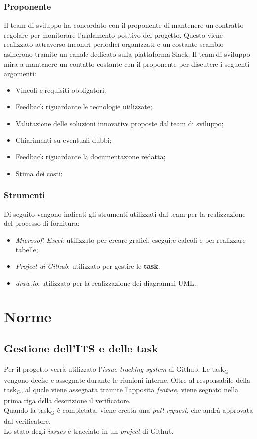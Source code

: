 \documentclass{article}
\begin{document}
\subsubsection{Proponente}
Il team di sviluppo ha concordato con il proponente di mantenere un contratto regolare per monitorare l'andamento positivo del progetto. Questo viene realizzato attraverso incontri periodici organizzati e un costante scambio asincrono tramite un canale dedicato sulla piattaforma Slack. Il team di sviluppo mira a mantenere un contatto costante con il proponente per discutere i seguenti argomenti:
\begin{itemize}
    \item Vincoli e requisiti obbligatori.
    \item Feedback riguardante le tecnologie utilizzate;
    \item Valutazione delle soluzioni innovative proposte dal team di sviluppo;
    \item Chiarimenti su eventuali dubbi;
    \item Feedback riguardante la documentazione redatta;
    \item Stima dei costi;
\end{itemize}

\subsubsection*{Strumenti}
Di seguito vengono indicati gli strumenti utilizzati dal team per la realizzazione del processo di fornitura:\begin{itemize}
    \item \textit{Microsoft Excel}: utilizzato per creare grafici, eseguire calcoli e per realizzare tabelle;
    \item \textit{Project di Github}: utilizzato per gestire le \textbf{task}.
    \item \textit{draw.io}: utilizzato per la realizzazione dei diagrammi UML.
\end{itemize}



\section{Norme}
\subsection{Gestione dell'ITS e delle task}
Per il progetto verrà utilizzato l'\textit{issue tracking system} di Github. Le task\textsubscript{G} vengono decise e assegnate durante le riunioni interne. Oltre al responsabile della task\textsubscript{G}, al quale viene assegnata tramite l'apposita \textit{feature}, viene segnato nella prima riga della descrizione il verificatore.\\
Quando la task\textsubscript{G} è completata, viene creata una \textit{pull-request}, che andrà approvata dal verificatore.\\
Lo stato degli \textit{issues} è tracciato in un \textit{project} di Github.
\end{document}
